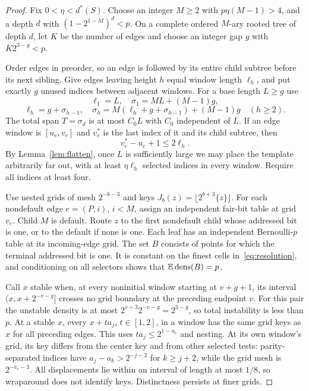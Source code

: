 \documentclass[11pt]{article}
\theoremstyle{remark}\newtheorem{remark}[theorem]{Remark}
\begin{document}
\begin{proof}
Fix $0<\eta<d^*(S)$. Choose an integer $M\ge2$ with $p\eta(M-1)>4$, and a depth $d$ with
$(1-2^{1-M})^d<p$. On a complete ordered $M$-ary rooted tree of depth $d$, let $K$ be the number of edges and choose an integer gap $g$ with $K2^{3-g}<p$.

Order edges in preorder, so an edge is followed by its entire child subtree before its next sibling. Give edges leaving height $h$ equal window length $\ell_h$, and put exactly $g$ unused indices between adjacent windows. For a base length $L\ge g$ use
\[
 \ell_1=L,\quad \sigma_1=ML+(M-1)g,
\]
\[
 \ell_h=g+\sigma_{h-1},\quad
 \sigma_h=M(\ell_h+g+\sigma_{h-1})+(M-1)g\quad(h\ge2).
\]
The total span $T=\sigma_d$ is at most $C_0L$ with $C_0$ independent of $L$. If an edge window is $[u_e,v_e]$ and $v_e^*$ is the last index of it and its child subtree, then
\begin{equation}\label{eq:local-span}
 v_e^*-u_e+1\le2\ell_h.
\end{equation}
By Lemma~\ref{lem:flatten}, once $L$ is sufficiently large we may place the template arbitrarily far out, with at least $\eta\ell_h$ selected indices in every window. Require all indices at least four.

Use nested grids of mesh $2^{-b-3}$ and keys
$J_b(z)=\lfloor2^{b+3}\{z\}\rfloor$. For each nondefault edge $e=(P,i)$, $i<M$, assign an independent fair-bit table at grid $v_e$. Child $M$ is default. Route $z$ to the first nondefault child whose addressed bit is one, or to the default if none is one. Each leaf has an independent Bernoulli-$p$ table at its incoming-edge grid. The set $B$ consists of points for which the terminal addressed bit is one. It is constant on the finest cells in~\eqref{eq:resolution}, and conditioning on all selectors shows that $\mathbb E\operatorname{dens}(B)=p$.

Call $x$ stable when, at every noninitial window starting at $v+g+1$, its interval $(x,x+2^{-v-g}]$ crosses no grid boundary at the preceding endpoint $v$. For this pair the unstable density is at most
$2^{v+3}2^{-v-g}=2^{3-g}$, so total instability is less than $p$. At a stable $x$, every $x+ta_j$, $t\in[1,2]$, in a window has the same grid keys as $x$ for all preceding edges. This uses $ta_j\le2^{1-u_e}$ and nesting. At its own window's grid, its key differs from the center key and from other selected tests: parity-separated indices have $a_j-a_k>2^{-j-2}$ for $k\ge j+2$, while the grid mesh is $2^{-v_e-3}$. All displacements lie within an interval of length at most $1/8$, so wraparound does not identify keys. Distinctness persists at finer grids.


\end{proof}
\end{document}
